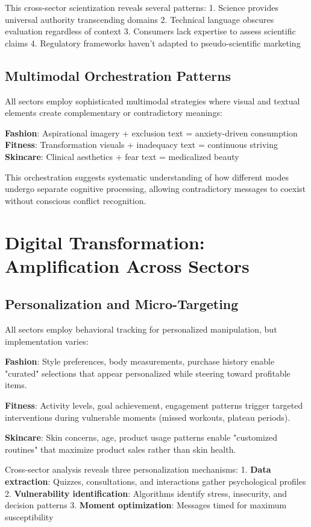 This cross-sector scientization reveals several patterns:
1. Science provides universal authority transcending domains
2. Technical language obscures evaluation regardless of context
3. Consumers lack expertise to assess scientific claims
4. Regulatory frameworks haven't adapted to pseudo-scientific marketing

\subsection{Multimodal Orchestration Patterns}

All sectors employ sophisticated multimodal strategies where visual and textual elements create complementary or contradictory meanings:

\textbf{Fashion}: Aspirational imagery + exclusion text = anxiety-driven consumption
\textbf{Fitness}: Transformation visuals + inadequacy text = continuous striving
\textbf{Skincare}: Clinical aesthetics + fear text = medicalized beauty

This orchestration suggests systematic understanding of how different modes undergo separate cognitive processing, allowing contradictory messages to coexist without conscious conflict recognition.

\section{Digital Transformation: Amplification Across Sectors}
\label{sec:digital_patterns}

\subsection{Personalization and Micro-Targeting}

All sectors employ behavioral tracking for personalized manipulation, but implementation varies:

\textbf{Fashion}: Style preferences, body measurements, purchase history enable "curated" selections that appear personalized while steering toward profitable items.

\textbf{Fitness}: Activity levels, goal achievement, engagement patterns trigger targeted interventions during vulnerable moments (missed workouts, plateau periods).

\textbf{Skincare}: Skin concerns, age, product usage patterns enable "customized routines" that maximize product sales rather than skin health.

Cross-sector analysis reveals three personalization mechanisms:
1. \textbf{Data extraction}: Quizzes, consultations, and interactions gather psychological profiles
2. \textbf{Vulnerability identification}: Algorithms identify stress, insecurity, and decision patterns
3. \textbf{Moment optimization}: Messages timed for maximum susceptibility

